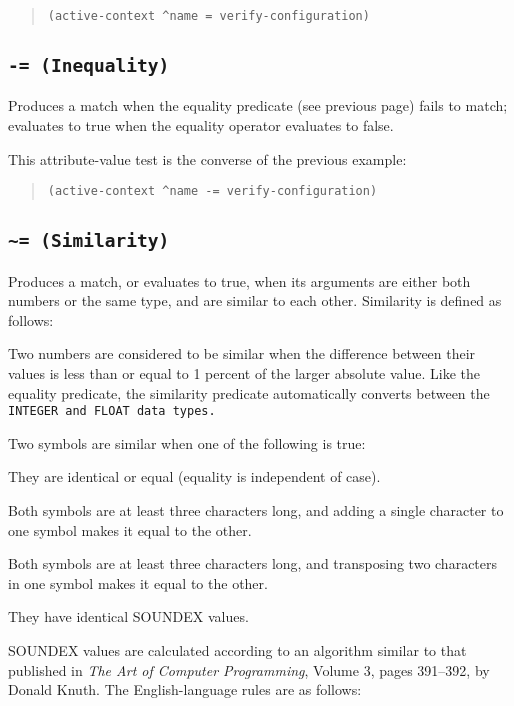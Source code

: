 \begin{quote}
\begin{verbatim}
(active-context ^name = verify-configuration)
\end{verbatim}
\end{quote}

\subsection{\tt{-=} (Inequality)}

Produces a match when the equality predicate (see previous page) fails
to match; evaluates to true when the equality operator evaluates to
false.

\Example
This attribute-value test is the converse of the previous
example:
\begin{quote}
\begin{verbatim}
(active-context ^name -= verify-configuration)
\end{verbatim}
\end{quote}


\subsection{\tt{\~{}=} (Similarity)}

Produces a match, or evaluates to true, when its arguments are either
both numbers or the same type, and are similar to each
other. Similarity is defined as follows:

Two numbers are considered to be similar when the difference between
their values is less than or equal to 1 percent of the larger absolute
value. Like the equality predicate, the similarity predicate
automatically converts between the \tt{INTEGER} and \tt{FLOAT} data types.

Two symbols are similar when one of the following is true:

They are identical or equal (equality is independent of case).

Both symbols are at least three characters long, and adding a single
character to one symbol makes it equal to the other.

Both symbols are at least three characters long, and transposing two
characters in one symbol makes it equal to the other.

They have identical SOUNDEX values.

SOUNDEX values are calculated according to an algorithm similar to
that published in \emph{The Art of Computer Programming}, Volume 3,
pages 391--392, by Donald Knuth.  The English-language rules are as
follows:

